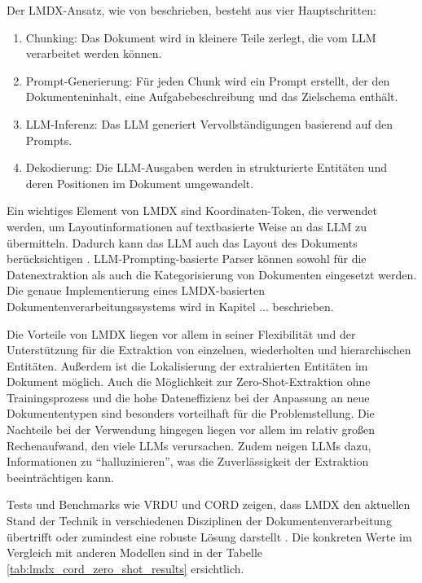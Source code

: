 Der \gls{LMDX}-Ansatz, wie von \textcite{PerotVincent2024LLMD} beschrieben, besteht aus vier Hauptschritten:

\begin{enumerate}
    \item Chunking: Das Dokument wird in kleinere Teile zerlegt, die vom \gls{LLM} verarbeitet werden können.
    \item Prompt-Generierung: Für jeden Chunk wird ein Prompt erstellt, der den Dokumenteninhalt, eine Aufgabebeschreibung und das Zielschema enthält.
    \item \gls{LLM}-Inferenz: Das \gls{LLM} generiert Vervollständigungen basierend auf den Prompts.
    \item Dekodierung: Die \gls{LLM}-Ausgaben werden in strukturierte Entitäten und deren Positionen im Dokument umgewandelt.
\end{enumerate}

Ein wichtiges Element von \gls{LMDX} sind Koordinaten-Token, die verwendet werden, um Layoutinformationen auf textbasierte Weise an das \gls{LLM} zu übermitteln. Dadurch kann das \gls{LLM} auch das Layout des Dokuments berücksichtigen \cite{PerotVincent2024LLMD}. LLM-Prompting-basierte Parser können sowohl für die Datenextraktion als auch die Kategorisierung von Dokumenten eingesetzt werden. Die genaue Implementierung eines \gls{LMDX}-basierten Dokumentenverarbeitungssystems wird in Kapitel ... beschrieben.

Die Vorteile von \gls{LMDX} liegen vor allem in seiner Flexibilität und der Unterstützung für die Extraktion von einzelnen, wiederholten und hierarchischen Entitäten. Außerdem ist die Lokalisierung der extrahierten Entitäten im Dokument möglich. Auch die Möglichkeit zur Zero-Shot-Extraktion ohne Trainingsprozess und die hohe Dateneffizienz bei der Anpassung an neue Dokumententypen sind besonders vorteilhaft für die Problemstellung. Die Nachteile bei der Verwendung hingegen liegen vor allem im relativ großen Rechenaufwand, den viele \glspl{LLM} verursachen. Zudem neigen \glspl{LLM} dazu, Informationen zu ``halluzinieren'', was die Zuverlässigkeit der Extraktion beeinträchtigen kann.

Tests und Benchmarks wie VRDU \cite{WangZilong2023VABf} und CORD \cite{park2019cord} zeigen, dass \gls{LMDX} den aktuellen Stand der Technik in verschiedenen Disziplinen der Dokumentenverarbeitung übertrifft oder zumindest eine robuste Lösung darstellt \cite{PerotVincent2024LLMD}. Die konkreten Werte im Vergleich mit anderen Modellen sind in der Tabelle \ref{tab:lmdx_cord_zero_shot_results} ersichtlich.

